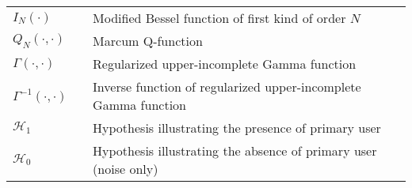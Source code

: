 \begin{longtable}{p{}p{}p{}}
       $I_{N}(\cdot)$	        & &	Modified Bessel function of first kind of order $N$ \\		
       $Q_{N}(\cdot, \cdot)$	& &	Marcum Q-function \\		
       $\Gamma(\cdot, \cdot)$	& &	Regularized upper-incomplete Gamma function\\		
       $\Gamma^{-1}(\cdot, \cdot)$	& &	Inverse function of regularized upper-incomplete Gamma function\\		
       $\mathcal H_1$			& &	Hypothesis illustrating the presence of primary user\\	
       $\mathcal H_0$			& &	Hypothesis illustrating the absence of primary user (noise only) \\		
\end{longtable}
  




